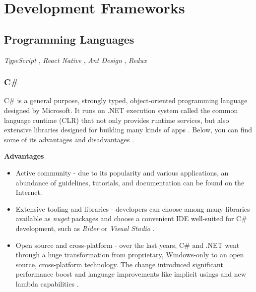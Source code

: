 \chapter{Development Frameworks} \label{ch:development_frameworks}

\section{Programming Languages}

\textit{TypeScript} \cite{type_script}, \textit{React Native} \cite{react_native}, \textit{Ant Design} \cite{ant_design}, \textit{Redux} \cite{redux}

\subsection{C\#}
C\# is a general purpose, strongly typed, object-oriented programming language designed by Microsoft. It runs on .NET execution system called the common language runtime (CLR) that not only provides runtime services, but also extensive libraries designed for building many kinds of apps \cite{c-sharp-tour}. Below, you can find some of its advantages and disadvantages .

\textbf{Advantages}
\begin{itemize}
    \item Active community - due to its popularity and various applications, an abundance of guidelines, tutorials, and documentation can be found on the Internet.
    \item Extensive tooling and libraries - developers can choose among many libraries available as \textit{nuget} packages and choose a convenient IDE well-suited for C\# development, such as \textit{Rider} or \textit{Visual Studio} \cite{nuget} \cite{net-tools}.
    \item Open source and cross-platform - over the last years, C\# and .NET went through a huge transformation from proprietary, Windows-only to an open source, cross-platform technology. The change introduced significant performance boost and language improvements like implicit usings and new lambda capabilities \cite{net6}. 
\end{itemize}


